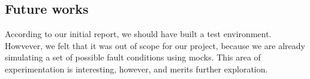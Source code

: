 \documentclass{scrartcl}
\begin{document}
\subsection{Future works}
\par According to our initial report, we should have built a test environment. Howvever, we felt that it was out of scope for our project, because we are already simulating a set of possible fault conditions using mocks. This area of experimentation is interesting, however, and merits further exploration.

\nocite{*} %
% 
% 

\printbibliography
\tableofcontents
\end{document}
